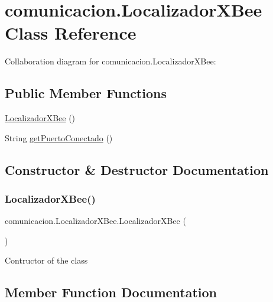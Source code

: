 \hypertarget{classcomunicacion_1_1_localizador_x_bee}{}\section{comunicacion.\+Localizador\+X\+Bee Class Reference}
\label{classcomunicacion_1_1_localizador_x_bee}


Collaboration diagram for comunicacion.\+Localizador\+X\+Bee\+:
\subsection*{Public Member Functions}
\begin{DoxyCompactItemize}
\item 
\mbox{\hyperlink{classcomunicacion_1_1_localizador_x_bee_a246b19fa74260ff10007ec9965e4af5e}{Localizador\+X\+Bee}} ()
\item 
String \mbox{\hyperlink{classcomunicacion_1_1_localizador_x_bee_a1c4e579949b66e7b134f31779b326ff3}{get\+Puerto\+Conectado}} ()
\end{DoxyCompactItemize}


\subsection{Constructor \& Destructor Documentation}
\mbox{\label{classcomunicacion_1_1_localizador_x_bee_a246b19fa74260ff10007ec9965e4af5e}} 
\subsubsection{\texorpdfstring{Localizador\+X\+Bee()}{LocalizadorXBee()}}
{\footnotesize\ttfamily comunicacion.\+Localizador\+X\+Bee.\+Localizador\+X\+Bee (\begin{DoxyParamCaption}{ }\end{DoxyParamCaption})\hspace{0.3cm}{\ttfamily [inline]}}

Contructor of the class 

\subsection{Member Function Documentation}
\mbox{\label{classcomunicacion_1_1_localizador_x_bee_a1c4e579949b66e7b134f31779b326ff3}} 
